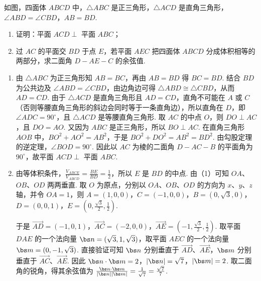 \begin{problem}
如图，四面体 \(ABCD\) 中，\(\triangle ABC\) 是正三角形，\(\triangle ACD\) 是直角三角形，\(\angle ABD=\angle CBD\)，\(AB=BD\).

\begin{enumerate}
\item 证明：平面 \(ACD\perp\) 平面 \(ABC\)；
\item 过 \(AC\) 的平面交 \(BD\) 于点 \(E\)，若平面 \(AEC\) 把四面体 \(ABCD\) 分成体积相等的两部分，求二面角 \(D-AE-C\) 的余弦值.
\end{enumerate}

\end{problem}

\begin{solution}
\begin{enumerate}
\item 由 \(\triangle ABC\) 为正三角形知 \(AB=BC\)，再由 \(AB=BD\) 得 \(BC=BD\). 结合 \(BD\) 为公共边及 \(\angle ABD=\angle CBD\)，由边角边可得 \(\triangle ABD\cong\triangle CBD\)，从而 \(AD=CD\). 由于 \(\triangle ACD\) 是直角三角形且 \(AD=CD\)，直角不可能在 \(A\) 或 \(C\)（否则等腰直角三角形的斜边会同时等于一条直角边），所以直角在 \(D\)，即 \(\angle ADC=90^\circ\)，且 \(\triangle ACD\) 是等腰直角三角形. 取 \(AC\) 的中点 \(O\)，则 \(DO\perp AC\)，且 \(DO=AO\). 又因为 \(ABC\) 是正三角形，所以 \(BO\perp AC\). 在直角三角形 \(AOB\) 中，\(BO^2+AO^2=AB^2\)，于是 \(BO^2+DO^2=AB^2=BD^2\). 由勾股定理的逆定理，\(\angle BOD=90^\circ\). 因此以 \(AC\) 为棱的二面角 \(D-AC-B\) 的平面角为 \(90^\circ\)，故平面 \(ACD\perp\) 平面 \(ABC\).
\item 由等体积条件，\(\frac{V_{ABCE}}{V_{ABCD}}=\frac{BE}{BD}=\frac12\)，所以 \(E\) 是 \(BD\) 的中点. 由（1）可知 \(OA\)、\(OB\)、\(OD\) 两两垂直. 取 \(O\) 为原点，分别以 \(OA\)、\(OB\)、\(OD\) 的方向为 \(x\)、\(y\)、\(z\) 轴，并令 \(OA=1\)，则 \(A=(1,0,0)\)，\(C=(-1,0,0)\)，\(B=(0,\sqrt3,0)\)，\(D=(0,0,1)\)，\(E=\left(0,\frac{\sqrt3}{2},\frac12\right)\).

于是 \(\overrightarrow{AD}=(-1,0,1)\)，\(\overrightarrow{AC}=(-2,0,0)\)，\(\overrightarrow{AE}=\left(-1,\frac{\sqrt3}{2},\frac12\right)\). 取平面 \(DAE\) 的一个法向量 \(\bs n=(\sqrt3,1,\sqrt3)\)，取平面 \(AEC\) 的一个法向量 \(\bs m=(0,-1,\sqrt3)\). 直接验证可知 \(\bs n\) 分别垂直于 \(\overrightarrow{AD}\)、\(\overrightarrow{AE}\)，\(\bs m\) 分别垂直于 \(\overrightarrow{AC}\)、\(\overrightarrow{AE}\). 因此 \(\bs n\cdot\bs m=2\)，\(|\bs n|=\sqrt7\)，\(|\bs m|=2\).
取二面角的锐角，得其余弦值为
\(\frac{\bs n\cdot\bs m}{|\bs n||\bs m|}=\frac{1}{\sqrt7}=\frac{\sqrt7}{7}\).
\end{enumerate}
\end{solution}

